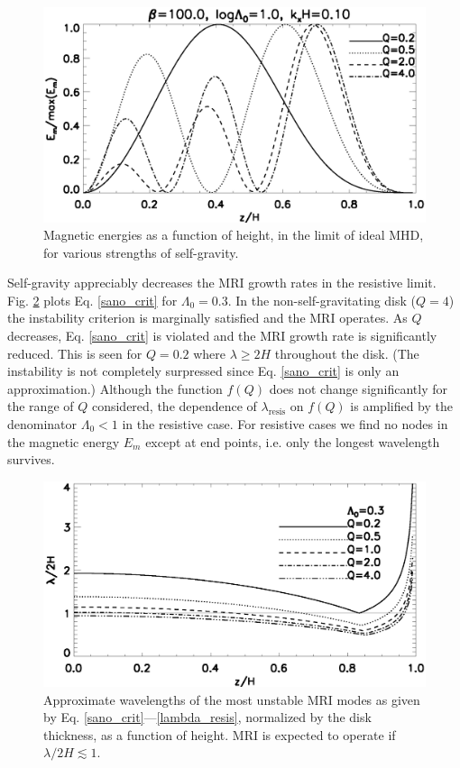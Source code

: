 \begin{figure}
  \includegraphics[width=\linewidth]{figures/compare_result_lambda10}
  \caption{Magnetic energies as a function of height, in the limit of
    ideal MHD, for various strengths of self-gravity.   
    \label{compare_result_lambda10}}
\end{figure}

Self-gravity appreciably decreases the MRI growth rates in the
resistive limit. Fig. \ref{lambda_poly_resis} plots 
Eq. \ref{sano_crit} for $\Lambda_0=0.3$. In the non-self-gravitating
disk ($Q=4$) the instability criterion is marginally satisfied and the
MRI operates. As $Q$ decreases, 
Eq. \ref{sano_crit} is violated and the MRI growth rate is
significantly reduced. This is seen for $Q=0.2$ where $\lambda \geq 2H$ throughout
the disk. (The instability is not completely surpressed since
Eq. \ref{sano_crit} is only an approximation.) Although the function
$f(Q)$ does not change significantly for the range of $Q$ considered, the
dependence of $\lambda_\mathrm{resis}$ on $f(Q)$ is amplified by the
denominator $\Lambda_0<1$ in the resistive case. For resistive cases
we find no nodes in the magnetic energy $E_m$ except at end points,
i.e. only the longest wavelength survives.    

\begin{figure}
  \includegraphics[width=\linewidth]{figures/lambda_poly_uniresis}
  \caption{Approximate wavelengths of the most unstable MRI modes as given by
    Eq. \ref{sano_crit}---\ref{lambda_resis}, normalized by the 
    disk thickness, as a function of height. MRI is expected to
    operate if $\lambda/2H\lesssim 1$. 
    \label{lambda_poly_resis}}
\end{figure}


